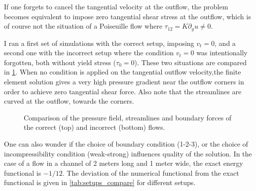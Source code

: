 \documentclass[11 pt]{report}
\begin{document}
If one forgets to cancel the tangential velocity at the outflow, the problem becomes equivalent to impose zero tangential shear stress at the outflow, which is of course not the situation of a Poiseuille flow where $\tau_{12} = K\partial_y u \neq 0$. 

\pagebreak
I ran a first set of simulations with the correct setup, imposing $v_t=0$, and a second one with the incorrect setup where the condition $v_t=0$ was intentionally forgotten, both without yield stress ($\tau_0=0$). These two situations are compared in \cref{fig:bc_issue}. When no condition is applied on the tangential outflow velocity,the finite element solution gives a very high pressure gradient near the outflow corners in order to achieve zero tangential shear force. Also note that the streamlines are curved at the outflow, towards the corners.

\begin{figure}[H]
    \centering
    \begin{subfigure}[t]{0.97\textwidth}
        
    \end{subfigure}
    \begin{subfigure}[t]{0.97\textwidth}
        
    \end{subfigure}
    \caption{Comparison of the pressure field, streamlines and boundary forces of the correct (top) and incorrect (bottom) flows.}
    \label{fig:bc_issue}
\end{figure}

One can also wonder if the choice of boundary condition (1-2-3), or the choice of incompressibility condition (weak-strong) influences quality of the solution. In the case of a flow in a channel of 2 meters long and 1 meter wide, the exact energy functional is $-1/12$. The deviation of the numerical functional from the exact functional is given in \cref{tab:setups_compare} for different setups. 
\end{document}
